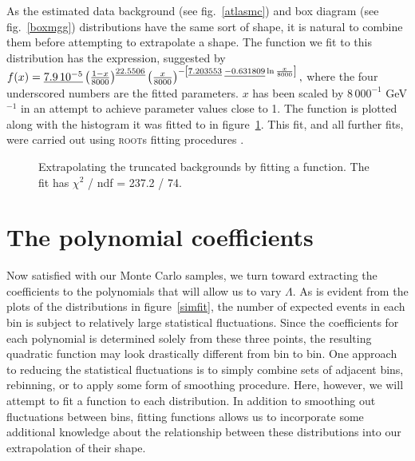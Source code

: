 As the estimated data background (see fig.~\ref{atlasmc}) and box diagram (see fig.~\ref{boxmgg}) distributions have the same sort of shape, it is natural to combine them before attempting to extrapolate a shape. The function we fit to this distribution has the expression, suggested by \cite{powlaw}
\(f(x)=\underline{7.9\,10^{-5}}\left(\frac{1-x}{8000}\right)^{\underline{22.5506}}\left(\frac{x}{8000}\right)^{-\left[\underline{7.203553}\;\underline{-0.631809}\ln\frac{x}{8000}\right]},\)
where the four underscored numbers are the fitted parameters. $x$ has been scaled by $8\,000^{-1}$ GeV$^{-1}$ in an attempt to achieve parameter values close to 1. The function is plotted along with the histogram it was fitted to in figure~\ref{bckfit}. This fit, and all further fits, were carried out using \textsc{root}s fitting procedures \cite{root}.

\begin{figure}[htp]
\begin{minipage}[b]{.69\textwidth}
\begin{infilsf} \tiny

\end{infilsf}
\end{minipage}
\begin{minipage}[b]{.3\textwidth}
\caption{Extrapolating the truncated backgrounds by fitting a function. The fit has $\chi^2$ / ndf = 237.2 / 74.}\label{bckfit}
\end{minipage}
\end{figure}

\section{The polynomial coefficients}
Now satisfied with our Monte Carlo samples, we turn toward extracting the coefficients to the polynomials that will allow us to vary $\Lambda$. As is evident from the plots of the distributions in figure~\ref{simfit}, the number of expected events in each bin is subject to relatively large statistical fluctuations. Since the coefficients for each polynomial is determined solely from these three points, the resulting quadratic function may look drastically different from bin to bin. One approach to reducing the statistical fluctuations is to simply combine sets of adjacent bins, rebinning, or to apply some form of smoothing procedure. Here, however, we will attempt to fit a function to each distribution. In addition to smoothing out fluctuations between bins, fitting functions allows us to incorporate some additional knowledge about the relationship between these distributions into our extrapolation of their shape.

